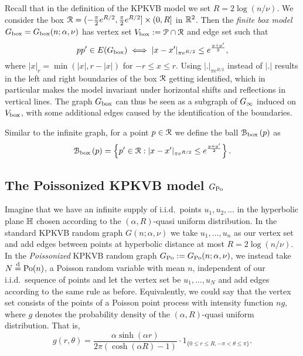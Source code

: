 Recall that in the definition of the KPKVB model we set $R = 2\log(n/\nu)$.
We consider the box ${\mathcal R} = (-\frac{\pi}{2}e^{R/2}, \frac{\pi}{2}e^{R/2}] \times (0, R]$ in ${\mathbb R}^2$. 
Then the \emph{finite box model} $G_{\mathrm{box}} = G_{\mathrm{box}}(n;\alpha, \nu)$ has vertex set $V_{\text{box}} := \mathcal{P} \cap {\mathcal R}$ and edge set such that
\[
	pp' \in E(G_{\mathrm{box}}) \iff |x - x'|_{\pi e^{R/2}} \leq e^{\frac{y + y'}{2}},
\]
where $|x|_{r} = \min( |x|, r - |x|)$ for $-r\leq x\leq r$. Using $|.|_{\pi e^{R/2}}$ instead of $|.|$ results in the left and right boundaries of the box ${\mathcal R}$ getting identified, which in particular makes the model invariant under horizontal shifts and reflections in vertical lines. 
The graph $G_{\mathrm{box}}$ can thus be seen as a subgraph of $G_{\infty}$ induced on $V_{\text{box}}$, with some additional edges caused by the identification of the boundaries.

Similar to the infinite graph, for a point $p \in {\mathcal R}$ we define the ball ${\mathcal B}_{\text{box}}\left(p\right)$ as
\begin{equation}\label{eq:def_ball_P_n}
	{\mathcal B}_{\text{box}}\left(p\right) = 
	\left\{p' \in {\mathcal R} : |x - x'|_{\pi e^{R/2}} \leq e^{\frac{y + y'}{2}}\right\}.
\end{equation}


\subsection{The Poissonized KPKVB model \texorpdfstring{$G_{{\mathrm{Po}}}$}{G Po}}


Imagine that we have an infinite supply of i.i.d.~points $u_1, u_2, \dots$ in the hyperbolic plane ${\mathbb H}$ chosen according to the $(\alpha, R)$-quasi uniform distribution. In the standard KPKVB random graph $G(n;\alpha,\nu)$ we take $u_1,\dots, u_n$ as our vertex set and add edges between points at hyperbolic distance at most $R = 2\log(n/\nu)$. In the \emph{Poissonized} KPKVB random graph $G_{{\mathrm{Po}}} := G_{{\mathrm{Po}}}(n;\alpha,\nu)$, we instead take $N\stackrel{\text{d}}{=} {\mathrm{Po}}(n)$, a Poisson random variable 
with mean $n$, independent of our i.i.d.~sequence of points and let the vertex set be $u_1,\dots, u_N$ and add edges 
according to the same rule as before. Equivalently, we could say that the vertex set consists of the points of a Poisson point process with intensity function $n g$, where $g$ denotes the probability density of the $(\alpha,R)$-quasi uniform distribution. That is,
\begin{equation}\label{eq:def_quasi_uniform_density}
	g(r,\theta) = \frac{\alpha\sinh(\alpha r)}{2\pi(\cosh(\alpha R) - 1)} \cdot 1_{\{0\leq r\leq R, -\pi<\theta\leq \pi\}}.
\end{equation}

